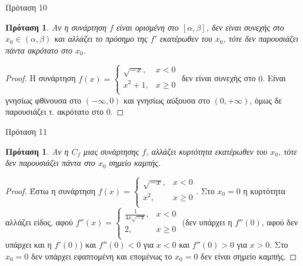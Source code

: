 \documentclass[greek]{beamer}
\newtheorem{proposition}[theorem]{Πρόταση}
\begin{document}
\begin{frame}{Πρόταση 10}
 \begin{proposition}
  \normalfont Aν η συνάρτηση $f$ είναι ορισμένη στο $\left[ \alpha ,\beta  \right]$, δεν είναι συνεχής στο ${{x}_{0}}\in \left( \alpha ,\beta  \right)$ και αλλάζει το πρόσημο της $f'$ εκατέρωθεν του ${{x}_{0}}$, τότε δεν παρουσιάζει πάντα ακρότατο στο ${{x}_{0}}$.
 \end{proposition}
 \begin{proof}
  H συνάρτηση $f\left( x \right)=\left\{ \begin{array}{*{35}{l}}
    \sqrt{-x},   & x<0    \\
    {{x}^{2}}+1, & x\ge 0 \\
   \end{array} \right.$ δεν είναι συνεχής στο $0$. Είναι γνησίως φθίνουσα στο $\left( -\infty ,0 \right)$ και γνησίως αύξουσα στο $\left( 0,+\infty  \right)$, όμως δε παρουσιάζει τ. ακρότατο στο $0$.
 \end{proof}
\end{frame}

\begin{frame}{Πρόταση 11}
 \begin{proposition}
  \normalfont Αν η ${{C}_{f}}$ μιας συνάρτησης $f$, αλλάζει κυρτότητα εκατέρωθεν του ${{x}_{0}}$, τότε δεν παρουσιάζει πάντα στο ${{x}_{0}}$ σημείο καμπής.
 \end{proposition}
 \begin{proof}
  Έστω η συνάρτηση $f\left( x \right)=\left\{ \begin{array}{*{35}{l}}
    \sqrt{-x}, & x<0    \\
    {{x}^{2}}, & x\ge 0 \\
   \end{array} \right.$. Στο ${{x}_{0}}=0$ η κυρτότητα αλλάζει είδος, αφού $f''\left( x \right)=\left\{ \begin{array}{*{35}{l}}
    \frac{1}{4x\sqrt{-x}}, & x<0    \\
    2,                     & x\ge 0 \\
   \end{array} \right.$ (δεν υπάρχει η $f''\left( 0 \right)$, αφού δεν υπάρχει και η $f'\left( 0 \right)$) και $f''\left( 0 \right)<0$ για $x<0$ και $f''\left( 0 \right)>0$ για $x>0$. Στο ${{x}_{0}}=0$ δεν υπάρχει εφαπτομένη και επομένως το ${{x}_{0}}=0$ δεν είναι σημείο καμπής.
 \end{proof}
\end{frame}
\end{document}
